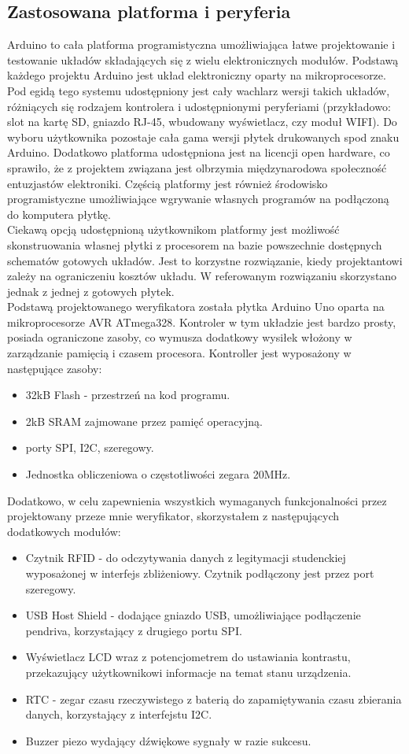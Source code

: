 \documentclass[declaration,shortabstract, mgr]{iithesis}
\begin{document}
\subsection{Zastosowana platforma i peryferia}
\indent Arduino to cała platforma programistyczna umożliwiająca łatwe projektowanie i testowanie układów składających się z wielu elektronicznych modułów. Podstawą każdego projektu Arduino jest układ elektroniczny oparty na mikroprocesorze. Pod egidą tego systemu udostępniony jest cały wachlarz wersji takich układów, różniących się rodzajem kontrolera i udostępnionymi peryferiami (przykładowo: slot na kartę SD, gniazdo RJ-45, wbudowany wyświetlacz, czy moduł WIFI). Do wyboru użytkownika pozostaje cała gama wersji płytek drukowanych spod znaku Arduino. Dodatkowo platforma udostępniona jest na licencji open hardware, co sprawiło, że z projektem związana jest olbrzymia międzynarodowa społeczność entuzjastów elektroniki. Częścią platformy jest również środowisko programistyczne umożliwiające wgrywanie własnych programów na podłączoną do komputera płytkę.\\
\indent Ciekawą opcją udostępnioną użytkownikom platformy jest możliwość skonstruowania własnej płytki z procesorem na bazie powszechnie dostępnych schematów gotowych układów. Jest to korzystne rozwiązanie, kiedy projektantowi zależy na ograniczeniu kosztów układu. W referowanym rozwiązaniu skorzystano jednak z jednej z gotowych płytek.\\
\indent Podstawą projektowanego weryfikatora została płytka Arduino Uno oparta na mikroprocesorze AVR ATmega328. Kontroler w tym układzie jest bardzo prosty, posiada ograniczone zasoby, co wymusza dodatkowy wysiłek włożony w zarządzanie pamięcią i czasem procesora. Kontroller jest wyposażony w następujące zasoby:
\begin{itemize}
\item 32kB Flash - przestrzeń na kod programu.
\item 2kB SRAM zajmowane przez pamięć operacyjną.
\item porty SPI, I2C, szeregowy.
\item Jednostka obliczeniowa o częstotliwości zegara 20MHz.
\end{itemize}
\indent Dodatkowo, w celu zapewnienia wszystkich wymaganych funkcjonalności przez projektowany przeze mnie weryfikator, skorzystałem z następujących dodatkowych modułów:
\begin{itemize}
\item Czytnik RFID - do odczytywania danych z legitymacji studenckiej wyposażonej w interfejs zbliżeniowy. Czytnik podłączony jest przez port szeregowy.
\item USB Host Shield - dodające gniazdo USB, umożliwiające podłączenie pendriva, korzystający z drugiego portu SPI.
\item Wyświetlacz LCD wraz z potencjometrem do ustawiania kontrastu, przekazujący użytkownikowi informacje na temat stanu urządzenia.
\item RTC - zegar czasu rzeczywistego z baterią do zapamiętywania czasu zbierania danych, korzystający z interfejstu I2C.
\item Buzzer piezo wydający dźwiękowe sygnały w razie sukcesu.
\end{itemize}
\end{document}
